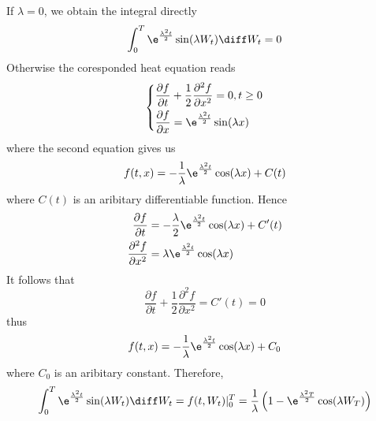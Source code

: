 \begin{subproblem}[(\alph*)]
        \item
        If $\lambda=0$, we obtain the integral directly
        \renewcommand{\thisf}[1]{\e^{\frac{\lambda^2t}2}\sin(\lambda #1)}
        \[\int_0^T\thisf{W_t}\diff W_t=0\]
        Otherwise the coresponded heat equation reads
        \[\left\{\begin{aligned}
            &\frac{\partial f}{\partial t}+\frac{1}{2}\frac{\partial^2 f}{\partial x^2}=0,t\geq 0\\
            &\frac{\partial f}{\partial x}=\thisf{x}
        \end{aligned}\right.\]
        where the second equation gives us
        \[f(t,x)=-\frac{1}{\lambda}\e^{\frac{\lambda^2t}{2}}\cos(\lambda x)+C(t)\]
        where $C(t)$ is an aribitary differentiable function. Hence
        \[\begin{aligned}
            \frac{\partial f}{\partial t}&=-\frac{\lambda}{2}
            \e^{\frac{\lambda^2t}{2}}\cos(\lambda x)+C'(t)\\
            \frac{\partial^2f}{\partial x^2}&=\lambda\e^{\frac{\lambda^2t}{2}}\cos(\lambda x)
        \end{aligned}\]
        It follows that
        \[\frac{\partial f}{\partial t}+\frac{1}{2}\frac{\partial^2 f}{\partial x^2}
        =C'(t)=0\]
        thus
        \[f(t,x)=-\frac{1}{\lambda}\e^{\frac{\lambda^2t}{2}}\cos(\lambda x)+C_0\]
        where $C_0$ is an aribitary constant. Therefore,
        \[\int_0^T\thisf{W_t}\diff W_t=f(t,W_t)|_0^T
        =\frac{1}{\lambda}\left(1-\e^{\frac{\lambda^2T}{2}}\cos(\lambda W_T)\right)\]
    \end{subproblem}

